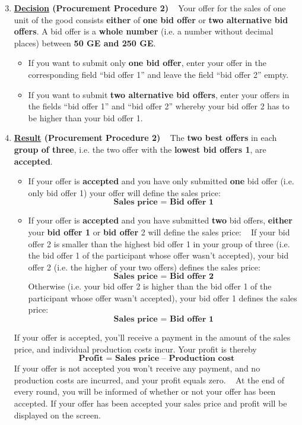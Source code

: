 \documentclass[11pt]{scrartcl}
\begin{document}

\begin{enumerate}[label=\textbf{\upshape(\arabic*\upshape)}] \setcounter{enumi}{2}
	\item \textbf{\underline{Decision} (Procurement Procedure 2)} ~\smallbreak
		Your offer for the sales of one unit of the good consists \textbf{either} of \textbf{one bid offer} or \textbf{two alternative bid offers}. A bid offer is a \textbf{whole number} (i.e. a number without decimal places) between \textbf{50 GE and 250 GE}. 
		\begin{itemize}
			\item If you want to submit only \textbf{one bid offer}, enter your offer in the corresponding field \enquote{bid offer 1} and leave the field \enquote{bid offer 2} empty.
			\item If you want to submit \textbf{two alternative bid offers}, enter your offers in the fields \enquote{bid offer 1} and \enquote{bid offer 2} whereby your bid offer 2 has to be higher than your bid offer 1.
		\end{itemize}
	\item \textbf{\underline{Result} (Procurement Procedure 2)} ~\smallbreak
		The \textbf{two best offers} in each \textbf{group of three}, i.e. the two offer with the \textbf{lowest bid offers 1}, are \textbf{accepted}.
		\begin{itemize}
			\item If your offer is \textbf{accepted} and you have only submitted \textbf{one} bid offer (i.e. only bid offer 1) your offer will define the sales price:
			$$ \textbf{Sales price = Bid offer 1} $$
			\item If your offer is \textbf{accepted} and you have submitted \textbf{two} bid offers, \textbf{either} your \textbf{bid offer 1} or \textbf{bid offer} 2 will define the sales price: ~\medbreak
			If your bid offer 2 is smaller than the highest bid offer 1 in your group of three (i.e. the bid offer 1 of the participant whose offer wasn’t accepted), your bid offer 2 (i.e. the higher of your two offers) defines the sales price:
				$$ \textbf{Sales price = Bid offer 2} $$
			Otherwise (i.e. your bid offer 2 is higher than the bid offer 1 of the participant whose offer wasn’t accepted), your bid offer 1 defines the sales price:
 				$$ \textbf{Sales price = Bid offer 1} $$
		\end{itemize}
		If your offer is accepted, you’ll receive a payment in the amount of the sales price, and individual production costs incur. Your profit is thereby
		$$ \textbf{Profit = Sales price – Production cost} $$
		If your offer is not accepted you won’t receive any payment, and no production costs are incurred, and your profit equals zero. ~\smallbreak
		At the end of every round, you will be informed of whether or not your offer has been accepted. If your offer has been accepted your sales price and profit will be displayed on the screen.
\end{enumerate}
\end{document}
